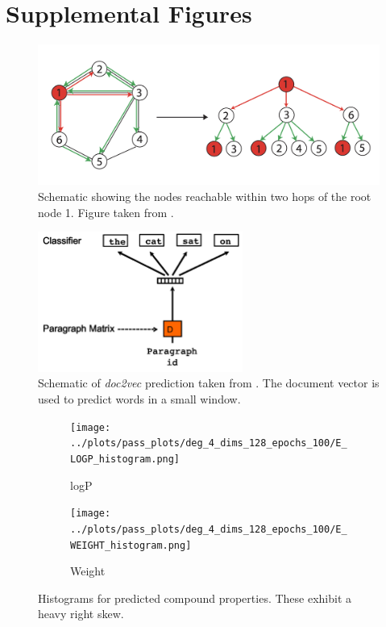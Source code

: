 \section{Supplemental Figures}

\begin{figure}[h]
\includegraphics[width=\textwidth]{figs/tree_height_2.png}
\caption{Schematic showing the nodes reachable within two hops of the root node 1. Figure taken from \citet{SchweitzerPASCAL2011}.}
\label{fig:tree}
\end{figure}

\begin{figure}[h]
\centering
\includegraphics[width=0.6\textwidth]{figs/paragraph2vec.png}
\caption{Schematic of \textit{doc2vec} prediction taken from \citet{Le2014}. The document vector is used to predict words in a small window.}
\label{doc2vec}
\end{figure}

\begin{figure}
\centering
\begin{subfigure}{0.45\linewidth}
    \texttt{[image: ../plots/pass\_plots/deg\_4\_dims\_128\_epochs\_100/E\_LOGP\_histogram.png]}
    \caption{logP}
\end{subfigure}
\begin{subfigure}{0.45\linewidth}
    \texttt{[image: ../plots/pass\_plots/deg\_4\_dims\_128\_epochs\_100/E\_WEIGHT\_histogram.png]}
    \caption{Weight}
\end{subfigure}
\caption{Histograms for predicted compound properties. These exhibit a heavy right skew.}
\label{fig:histograms}
\end{figure}



